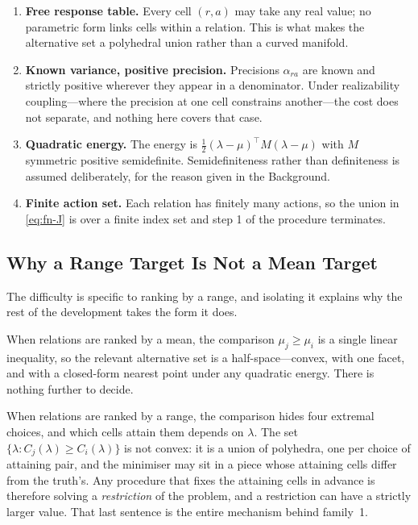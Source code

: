 \begin{enumerate}
\item[1)] \textbf{Free response table.} Every cell $(r,a)$ may take any real value; no
parametric form links cells within a relation. This is what makes the alternative set a
polyhedral union rather than a curved manifold.

\item[2)] \textbf{Known variance, positive precision.} Precisions $\alpha_{ra}$ are known and
strictly positive wherever they appear in a denominator. Under realizability coupling---where
the precision at one cell constrains another---the cost does not separate, and nothing here
covers that case.

\item[3)] \textbf{Quadratic energy.} The energy is $\tfrac12(\lambda-\mu)^{\top}M(\lambda-\mu)$
with $M$ symmetric positive semidefinite. Semidefiniteness rather than definiteness is
assumed deliberately, for the reason given in the Background.

\item[4)] \textbf{Finite action set.} Each relation has finitely many actions, so the union in
\eqref{eq:fn-J} is over a finite index set and step 1 of the procedure terminates.
\end{enumerate}

\subsection{Why a Range Target Is Not a Mean Target}

The difficulty is specific to ranking by a range, and isolating it explains why the rest of
the development takes the form it does.

When relations are ranked by a mean, the comparison $\mu_{j}\ge\mu_{i}$ is a single linear
inequality, so the relevant alternative set is a half-space---convex, with one facet, and
with a closed-form nearest point under any quadratic energy. There is nothing further to
decide.

When relations are ranked by a range, the comparison hides four extremal choices, and which
cells attain them depends on $\lambda$. The set $\{\lambda:C_{j}(\lambda)\ge C_{i}(\lambda)\}$
is not convex: it is a union of polyhedra, one per choice of attaining pair, and the
minimiser may sit in a piece whose attaining cells differ from the truth's. Any procedure
that fixes the attaining cells in advance is therefore solving a \emph{restriction} of the
problem, and a restriction can have a strictly larger value. That last sentence is the entire
mechanism behind family~1.

